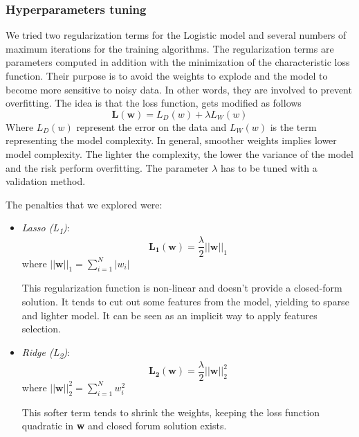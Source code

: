 \subsubsection{Hyperparameters tuning}
We tried two regularization terms for the Logistic model and several numbers of maximum iterations for the training algorithms.
The regularization terms are parameters computed in addition with the minimization of the characteristic loss function. Their purpose is to avoid the weights to explode and the model to become more sensitive to noisy data. In other words, they are involved to prevent overfitting.
The idea is that the loss function, gets modified as follows
\[ \mathbf{L(w)} = L_{D}(w) + \lambda L_{W}(w)\]
Where $ L_{D}(w)  $ represent the error on the data and $ L_{W}(w)  $ is the term representing the model complexity. In general, smoother weights implies lower model complexity. The lighter the complexity, the lower the variance of the model and the risk perform overfitting.
The parameter $ \mathit{\lambda} $ has to be tuned with a validation method.

The penalties that we explored were:
\begin{itemize}
	\item[\PencilRight] \textit{Lasso (L\textsubscript{1})}:
	\[ \mathbf{L_{1}(w) }= \frac{\lambda}{2} ||\mathbf{w}||_{1} \]
	where $ ||\mathbf{w}||_{1} = \sum_{i=1}^{N}|w_{i}| $
	
	This regularization function is non-linear and doesn't provide a closed-form solution. It tends to cut out some features from the model, yielding to sparse and lighter model. It can be seen as an implicit way to apply features selection.
	
	\item[\PencilRight] \textit{Ridge (L\textsubscript{2})}:
	\[ \mathbf{L_{2}(w) }= \frac{\lambda}{2} ||\mathbf{w}||^{2}_{2} \]
	where $ ||\mathbf{w}||^{2}_{2} = \sum_{i=1}^{N}w_{i}^{2} $
	
	This softer term tends to shrink the weights, keeping the loss function quadratic in \textbf{w} and closed forum solution exists.
\end{itemize}

